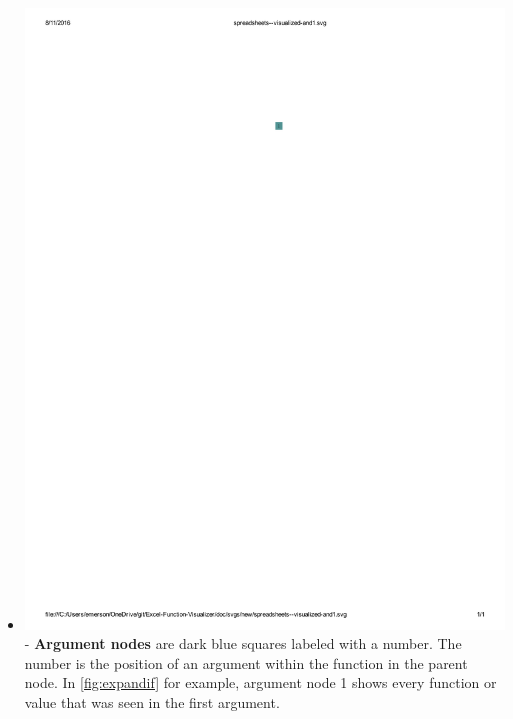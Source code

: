 \documentclass[conference]{IEEEtran}
\begin{document}
\begin{itemize}
		\item  \vspace{.25cm} \includegraphics{glossary-blue} - \textbf{Argument nodes} are dark blue
		squares labeled with a number. The number is the position of an argument
		within the function in the parent node. In \ref{fig:expandif} for example,
		argument node 1 shows every function or value that was seen in the first
		argument.
		

\end{itemize}
\end{document}
